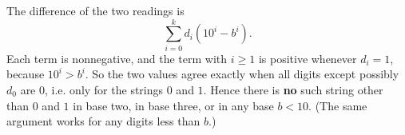 The difference of the two readings is
\[
\sum_{i=0}^{k}d_i\left(10^i-b^i\right).
\]
Each term is nonnegative, and the term with $i\ge1$ is positive whenever $d_i=1$, because $10^i>b^i$. So the two values agree exactly when all digits except possibly $d_0$ are $0$, i.e. only for the strings $0$ and $1$. Hence there is \textbf{no} such string other than $0$ and $1$ in base two, in base three, or in any base $b<10$. (The same argument works for any digits less than $b$.)
